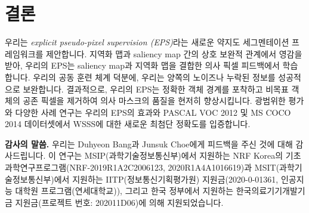 \documentclass[final]{cvpr}
\begin{document}
\section{결론}
우리는 \emph{explicit pseudo-pixel supervision (EPS)}라는 새로운 약지도 세그멘테이션 프레임워크를 제안합니다. 지역화 맵과 saliency map 간의 상호 보완적 관계에서 영감을 받아, 우리의 EPS는 saliency map과 지역화 맵을 결합한 의사 픽셀 피드백에서 학습합니다. 우리의 공동 훈련 체계 덕분에, 우리는 양쪽의 노이즈나 누락된 정보를 성공적으로 보완합니다. 결과적으로, 우리의 EPS는 정확한 객체 경계를 포착하고 비목표 객체의 공존 픽셀을 제거하여 의사 마스크의 품질을 현저히 향상시킵니다. 광범위한 평가와 다양한 사례 연구는 우리의 EPS의 효과와 PASCAL VOC 2012 및 MS COCO 2014 데이터셋에서 WSSS에 대한 새로운 최첨단 정확도를 입증합니다.

\noindent\textbf{감사의 말씀. }
우리는 Duhyeon Bang과 Junsuk Choe에게 피드백을 주신 것에 대해 감사드립니다. 이 연구는 MSIP(과학기술정보통신부)에서 지원하는 NRF Korea의 기초과학연구프로그램(NRF-2019R1A2C2006123, 2020R1A4A1016619)과 MSIT(과학기술정보통신부)에서 지원하는 IITP(정보통신기획평가원) 지원금(2020-0-01361, 인공지능 대학원 프로그램(연세대학교)), 그리고 한국 정부에서 지원하는 한국의료기기개발기금 지원금(프로젝트 번호: 202011D06)에 의해 지원되었습니다.

{\small


}
\end{document}
